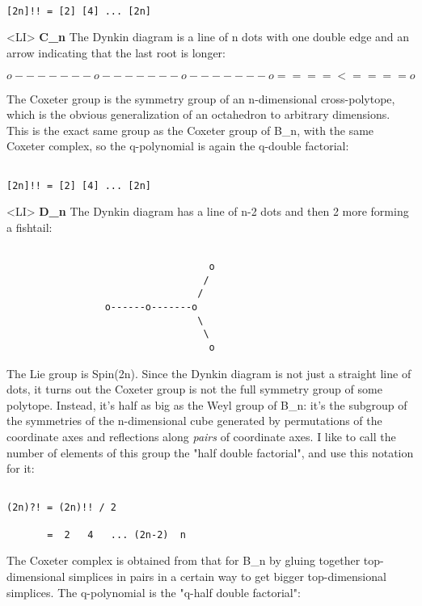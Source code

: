 \begin{verbatim}

[2n]!! = [2] [4] ... [2n]
\end{verbatim}
    
<LI>
\textbf{C_{n}}
The Dynkin diagram is a line of n dots with one double edge
and an arrow indicating that the last root is longer:


$$

                 o-------o-------o-------o====<====o 
$$
    
The Coxeter group is the symmetry group of an n-dimensional cross-polytope,
which is the obvious generalization of an octahedron to arbitrary
dimensions.  This is the exact same group as the Coxeter group of B_{n},
with the same Coxeter complex, so the q-polynomial is again the q-double
factorial:


\begin{verbatim}

[2n]!! = [2] [4] ... [2n]
\end{verbatim}
    
<LI>
\textbf{D_{n}}  The Dynkin diagram has a line of n-2 dots and then 2 more
forming a fishtail:
   

\begin{verbatim}

                                   o 
                                  /
                                 /
                 o------o-------o 
                                 \
                                  \
                                   o
\end{verbatim}
    
The Lie group is Spin(2n).  Since the Dynkin diagram is not just a
straight line of dots, it turns out the Coxeter group is not the full
symmetry group of some polytope.  Instead, it's half as big as the Weyl
group of B_{n}: it's the subgroup of the symmetries of the
n-dimensional cube generated by permutations of the coordinate axes and
reflections along \emph{pairs} of coordinate axes.  I like to call the number
of elements of this group the "half double factorial", and use
this notation for it:


\begin{verbatim}

(2n)?! = (2n)!! / 2

       =  2   4   ... (2n-2)  n
\end{verbatim}
    
The Coxeter complex is obtained from that for B_{n} by gluing together
top-dimensional simplices in pairs in a certain way to get bigger
top-dimensional simplices.  The q-polynomial is the "q-half double 
factorial":


